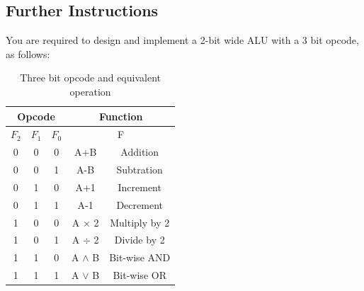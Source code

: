 \subsection{Further Instructions}
You are required to design and implement a 2-bit wide ALU with a 3 bit opcode, as follows:
\begin{table}[H]
\centering
\caption{Three bit opcode and equivalent operation}
\label{tbl:Opcodes}
\begin{tabular}{|c|c|c|c|c|}
\hline
\multicolumn{3}{|c|}{\textbf{Opcode}} & \multicolumn{2}{c|}{\textbf{Function}} \\ \hline
$F_2$ & $F_1$ & $F_0$ & \multicolumn{2}{c|}{F} \\ \hline
0 & 0 & 0 & A+B & Addition \\ \hline
0 & 0 & 1 & A-B & Subtration \\ \hline
0 & 1 & 0 & A+1 & Increment \\ \hline
0 & 1 & 1 & A-1 & Decrement \\ \hline
1 & 0 & 0 & A $\times$ 2 & Multiply by 2 \\ \hline
1 & 0 & 1 & A $\div$ 2 & Divide by 2 \\ \hline
1 & 1 & 0 & A $\wedge$ B & Bit-wise AND \\ \hline
1 & 1 & 1 & A $\vee$ B & Bit-wise OR \\ \hline
\end{tabular}%
\end{table}
